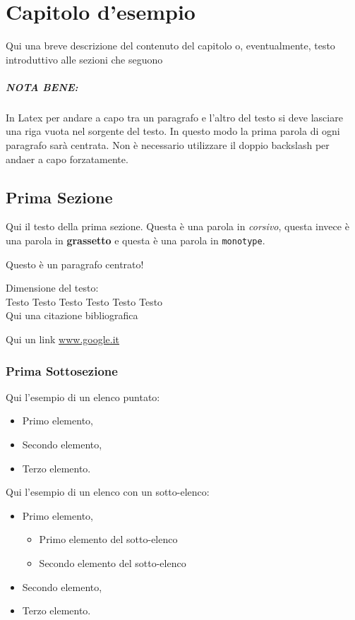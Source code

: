 \chapter{Capitolo d'esempio}
Qui una breve descrizione del contenuto del capitolo o, eventualmente, testo introduttivo alle sezioni che seguono

\paragraph{NOTA BENE:} In Latex per andare a capo tra un paragrafo e l'altro del testo si deve lasciare una riga vuota nel sorgente del testo. In questo modo la prima parola di ogni paragrafo sarà centrata. Non è necessario utilizzare il doppio backslash per andaer a capo forzatamente.


\section{Prima Sezione}
Qui il testo della prima sezione. Questa è  una parola in \textit{corsivo}, questa invece è una parola in \textbf{grassetto} e questa è una parola in \texttt{monotype}.

\begin{center}
Questo è un paragrafo centrato!
\end{center}

Dimensione del testo:\\

\LARGE{Testo} \Large{Testo} \large{Testo} \normalsize{Testo} \small{Testo} \footnotesize{Testo}\\

Qui una citazione bibliografica \cite{Lingiardi}

Qui un link \url{www.google.it}


\subsection{Prima Sottosezione}

Qui l'esempio di un elenco puntato:

\begin{itemize}
\item Primo elemento,
\item Secondo elemento,
\item Terzo elemento.
\end{itemize}

Qui l'esempio di un elenco con un sotto-elenco:

\begin{itemize}
\item Primo elemento,
\begin{itemize}
\item Primo elemento del sotto-elenco
\item Secondo elemento del sotto-elenco
\end{itemize}
\item Secondo elemento,
\item Terzo elemento.
\end{itemize}

